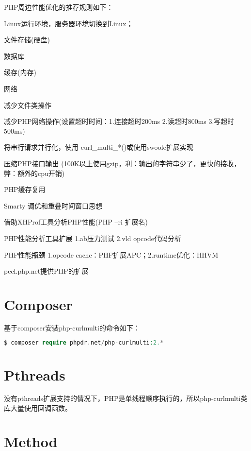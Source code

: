 PHP周边性能优化的推荐规则如下：

\begin{compactitem}
\item Linux运行环境，服务器环境切换到Linux；
\item 文件存储(硬盘)
\item 数据库
\item 缓存(内存)
\item 网络
\item 减少文件类操作
\item 减少PHP网络操作(设置超时时间：1.连接超时200ms 2.读超时800ms 3.写超时500ms)
\item 将串行请求并行化，使用 curl\_multi\_*()或使用swoole扩展实现

\item 压缩PHP接口输出 (100K以上使用gzip，利：输出的字符串少了，更快的接收，弊：额外的cpu开销)
\item PHP缓存复用
\item Smarty 调优和重叠时间窗口思想
\item 借助XHProf工具分析PHP性能(PHP --ri 扩展名)
\item PHP性能分析工具扩展 1.ab压力测试 2.vld opcode代码分析
\item PHP性能瓶颈 1.opcode cache：PHP扩展APC；2.runtime优化：HHVM
\item pecl.php.net提供PHP的扩展
\end{compactitem}


\section{Composer}


基于composer安装php-curlmulti的命令如下：

\begin{lstlisting}[language=PHP]
$ composer require phpdr.net/php-curlmulti:2.*
\end{lstlisting}


\section{Pthreads}



没有pthreads扩展支持的情况下，PHP是单线程顺序执行的，所以php-curlmulti类库大量使用回调函数。


\section{Method}



